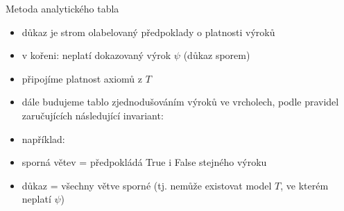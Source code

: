\documentclass{beamer}
\begin{document}
\begin{frame}{Metoda analytického tabla}

\begin{itemize}
    \item důkaz je strom olabelovaný předpoklady o platnosti výroků
    \item v kořeni: \alert{neplatí} dokazovaný výrok $\psi$ (důkaz sporem)
    \item připojíme platnost axiomů z $T$
    \item dále budujeme tablo zjednodušováním výroků ve vrcholech, podle pravidel zaručujících následující \alert{invariant}:
    
    \bigskip
    
    \bigskip

    \item například:
    
    \bigskip
    \smallskip    
        

    \item \alert{sporná} větev = předpokládá True i False stejného výroku
    \item \alert{důkaz} = všechny větve sporné (tj. nemůže existovat model $T$, ve kterém neplatí $\psi$)
\end{itemize}

\end{frame}
\end{document}
